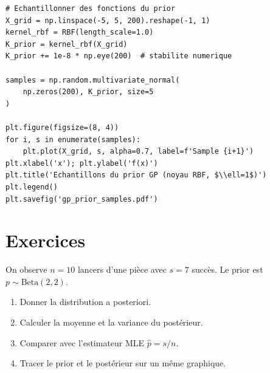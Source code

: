 \begin{codeblock}[title=\textbf{\'Echantillonnage du prior GP}]
\begin{verbatim}
# Echantillonner des fonctions du prior
X_grid = np.linspace(-5, 5, 200).reshape(-1, 1)
kernel_rbf = RBF(length_scale=1.0)
K_prior = kernel_rbf(X_grid)
K_prior += 1e-8 * np.eye(200)  # stabilite numerique

samples = np.random.multivariate_normal(
    np.zeros(200), K_prior, size=5
)

plt.figure(figsize=(8, 4))
for i, s in enumerate(samples):
    plt.plot(X_grid, s, alpha=0.7, label=f'Sample {i+1}')
plt.xlabel('x'); plt.ylabel('f(x)')
plt.title('Echantillons du prior GP (noyau RBF, $\\ell=1$)')
plt.legend()
plt.savefig('gp_prior_samples.pdf')
\end{verbatim}
\end{codeblock}

\section{Exercices}
\label{sec:exercises-ch10}

\begin{exercice}
On observe $n = 10$ lancers d'une pi\`ece avec $s = 7$ succ\`es. Le prior est
$p \sim \text{Beta}(2, 2)$.
\begin{enumerate}
  \item Donner la distribution a posteriori.
  \item Calculer la moyenne et la variance du post\'erieur.
  \item Comparer avec l'estimateur MLE $\hat{p} = s/n$.
  \item Tracer le prior et le post\'erieur sur un m\^eme graphique.
\end{enumerate}
\end{exercice}


